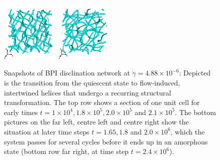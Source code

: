 \documentclass[8.5pt,twoside,twocolumn]{article}
\newcommand{\e}[1]{\times10^{#1}}
\begin{document}
\begin{figure}[htpb]
\includegraphics[width=0.245\textwidth]{disc-xy-2000k_run1115r.png}
\includegraphics[width=0.245\textwidth]{disc-xy-2400k_run1115r.png}
\caption{Snapshots of BPI disclination network at $\dot{\gamma}=4.88\e{-6}$: 
Depicted is the transition from the quiescent state to flow-induced, intertwined 
helices that undergo a recurring structural transformation. The top row
shows a section of one unit cell for early times 
$t=1\e{4}, 1.8\e{5}, 2.0\e{5}$ and $2.1\e{5}$. The bottom 
pictures on the far left, centre left and centre right 
show the situation at later time steps $t=1.65, 1.8$ and $2.0\e{6}$,
which the system passes for several cycles before it ends up in
an amorphous state (bottom row far right, at time step $t=2.4\e{6}$).}
\label{bp1-1-disc}
\end{figure}
\end{document}

